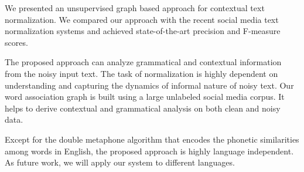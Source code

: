 \documentclass[a4paper,onesided,12pt]{report}
\begin{document}
We presented an unsupervised graph based approach for contextual text normalization. We compared our approach with the recent social media text normalization systems and achieved state-of-the-art precision and F-measure scores.

The proposed approach can analyze grammatical and contextual information from the noisy input text. The task of normalization is highly dependent on understanding and capturing the dynamics of informal nature of noisy text. Our word association graph is built using a large unlabeled social media corpus. It helps to derive contextual and grammatical analysis on both clean and noisy data.

Except for the double metaphone algorithm that encodes the phonetic similarities among words in English, the proposed approach is highly language independent. As future work, we will apply our system to different languages.


\end{document}
